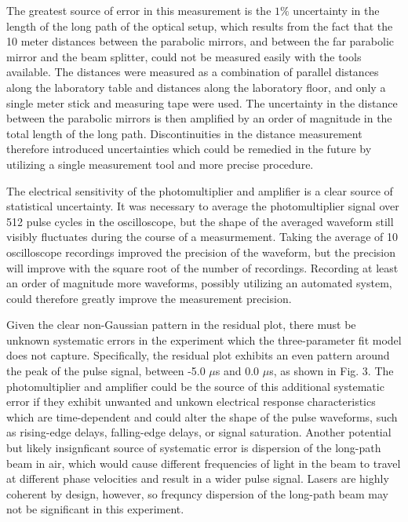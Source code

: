 \documentclass[%
 reprint,
 amsmath,amssymb,
 aps,
]{revtex4-2}
\begin{document}
The greatest source of error in this measurement is the $1\%$ uncertainty in the length of the long path of the optical setup, which results from the fact that the 10 meter distances between the parabolic mirrors, and between the far parabolic mirror and the beam splitter, could not be measured easily with the tools available. The distances were measured as a combination of parallel distances along the laboratory table and distances along the laboratory floor, and only a single meter stick and measuring tape were used. The uncertainty in the distance between the parabolic mirrors is then amplified by an order of magnitude in the total length of the long path. Discontinuities in the distance measurement therefore introduced uncertainties which could be remedied in the future by utilizing a single measurement tool and more precise procedure. 

The electrical sensitivity of the photomultiplier and amplifier is a clear source of statistical uncertainty. It was necessary to average the photomultiplier signal over 512 pulse cycles in the oscilloscope, but the shape of the averaged waveform still visibly fluctuates during the course of a measurmement. Taking the average of 10 oscilloscope recordings improved the precision of the waveform, but the precision will improve with the square root of the number of recordings. Recording at least an order of magnitude more waveforms, possibly utilizing an automated system, could therefore greatly improve the measurement precision.

Given the clear non-Gaussian pattern in the residual plot, there must be unknown systematic errors in the experiment which the three-parameter fit model does not capture. Specifically, the residual plot exhibits an even pattern around the peak of the pulse signal, between -5.0 $\mu$s and 0.0 $\mu$s, as shown in Fig. 3. The photomultiplier and amplifier could be the source of this additional systematic error if they exhibit unwanted and unkown electrical response characteristics which are time-dependent and could alter the shape of the pulse waveforms, such as rising-edge delays, falling-edge delays, or signal saturation. Another potential but likely insignficant source of systematic error is dispersion of the long-path beam in air, which would cause different frequencies of light in the beam to travel at different phase velocities and result in a wider pulse signal. Lasers are highly coherent by design, however, so frequncy dispersion of the long-path beam may not be significant in this experiment.  
\end{document}
